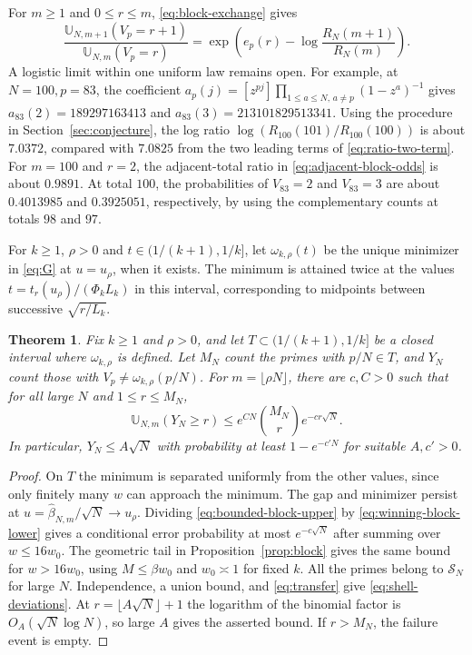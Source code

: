 \documentclass[11pt]{amsart}
\newtheorem{theorem}{Theorem}[section]
\theoremstyle{remark}
\begin{document}
For \(m\ge1\) and \(0\le r\le m\), \eqref{eq:block-exchange} gives
\begin{equation}\label{eq:adjacent-block-odds}
 \frac{\mathbb U_{N,m+1}(V_p=r+1)}{\mathbb U_{N,m}(V_p=r)}
 =\exp\!\left(e_p(r)-\log\frac{R_N(m+1)}{R_N(m)}\right).
\end{equation}
A logistic limit within one uniform law remains open. For example,
at \(N=100,p=83\), the coefficient
\(a_p(j)=[z^{pj}]\prod_{1\le a\le N,\,a\ne p}(1-z^a)^{-1}\)
gives \(a_{83}(2)=189297163413\) and \(a_{83}(3)=213101829513341\).
Using the procedure in Section~\ref{sec:conjecture}, the log ratio
\(\log(R_{100}(101)/R_{100}(100))\) is about \(7.0372\), compared
with \(7.0825\) from the two leading terms of \eqref{eq:ratio-two-term}.
For \(m=100\) and \(r=2\), the adjacent-total ratio in
\eqref{eq:adjacent-block-odds} is about \(0.9891\).
At total \(100\), the probabilities of \(V_{83}=2\) and \(V_{83}=3\)
are about \(0.4013985\) and \(0.3925051\), respectively, by using
the complementary counts at totals \(98\) and \(97\).

For \(k\ge1\), \(\rho>0\) and \(t\in(1/(k+1),1/k]\), let
\(\omega_{k,\rho}(t)\) be the unique
minimizer in \eqref{eq:G} at \(u=u_\rho\), when it exists. The minimum
is attained twice at the values \(t=t_r(u_\rho)/(\Phi_kL_k)\) in this
interval, corresponding to midpoints between successive \(\sqrt{r/L_k}\).

\begin{theorem}
\label{thm:fixed-shells}
Fix \(k\ge1\) and \(\rho>0\), and let \(T\subset(1/(k+1),1/k]\) be a closed
interval where \(\omega_{k,\rho}\) is defined. Let \(M_N\) count the primes
with \(p/N\in T\), and \(Y_N\) count those with \(V_p\ne\omega_{k,\rho}(p/N)\).
For \(m=\lfloor\rho N\rfloor\), there are \(c,C>0\) such that for all
large \(N\) and \(1\le r\le M_N\),
\begin{equation}
 \mathbb U_{N,m}(Y_N\ge r)\le e^{CN}\binom{M_N}{r}e^{-cr\sqrt N}.
 \label{eq:shell-deviations}
\end{equation}
In particular, \(Y_N\le A\sqrt N\) with probability at least \(1-e^{-c'N}\)
for suitable \(A,c'>0\).
\end{theorem}

\begin{proof}
On \(T\) the minimum is separated uniformly from the other values,
since only finitely many \(w\) can approach the minimum.
The gap and minimizer persist at
\(u=\widehat\beta_{N,m}/\sqrt N\to u_\rho\).
Dividing \eqref{eq:bounded-block-upper} by \eqref{eq:winning-block-lower}
gives a conditional error probability at most \(e^{-c\sqrt N}\) after
summing over \(w\le16w_0\). The geometric tail in
Proposition~\ref{prop:block} gives the same bound for \(w>16w_0\), using
\(M\le\beta w_0\) and \(w_0\asymp1\) for fixed \(k\).
All the primes belong to \(\mathcal S_N\) for large \(N\). Independence,
a union bound, and \eqref{eq:transfer} give \eqref{eq:shell-deviations}.
At \(r=\lfloor A\sqrt N\rfloor+1\) the logarithm of the binomial factor is
\(O_A(\sqrt N\log N)\), so large \(A\) gives the asserted bound.
If \(r>M_N\), the failure event is empty.
\end{proof}
\end{document}
